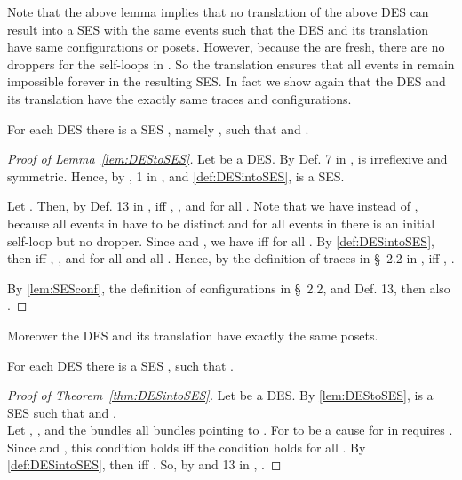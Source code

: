 \documentclass[runningheads,a4paper]{llncs}
\begin{document}
Note that the above lemma implies that no translation of the above DES can result into a SES with the same events such that the DES and its translation have same configurations or posets.
However, because the  are fresh, there are no droppers for the self-loops  in . So the translation ensures that all events in  remain impossible forever in the resulting SES. In fact we show again that the DES and its translation have the exactly same traces and configurations.

\begin{lemma}
	\label{lem:DEStoSES}
	For each DES  there is a SES , namely , such that  and .
\end{lemma}

\begin{proof}[Proof of Lemma~\ref{lem:DEStoSES}]
	Let  be a DES. By Def. 7 in \cite{dynamicCausality15},  is irreflexive and symmetric. Hence, by , 1 in \cite{dynamicCausality15}, and \ref{def:DESintoSES},  is a SES.	
	
	Let .	Then, by Def. 13 in \cite{dynamicCausality15},  iff , , and  for all . Note that we have  instead of , because all events in  have to be distinct and for all events in  there is an initial self-loop but no dropper.
	Since  and , we have   iff  for all .
	By \ref{def:DESintoSES}, then  iff , , and  for all  and all .
	Hence, by the definition of traces in \S~2.2 in \cite{dynamicCausality15},  iff , \ie .
	
	By \lem\ref{lem:SESconf}, the definition of
	configurations in \S~2.2, and Def. 13, then
	also .
\end{proof}

Moreover the DES and its translation have exactly the same posets.

\begin{theorem}
	\label{thm:DESintoSES}
	For each DES  there is a SES , such that .
\end{theorem}

\begin{proof}[Proof of Theorem~\ref{thm:DESintoSES}]
	Let  be a DES. By \lem\ref{lem:DEStoSES},  is a SES such that  and .\\
	Let , , and the bundles  all bundles pointing to .
	For  to be a cause for   in \cite{dynamicCausality15} requires .
	Since  and , this condition holds iff the condition  holds for all .
	By \ref{def:DESintoSES}, then  iff .
	So, by  and 13 in \cite{dynamicCausality15}, .
\end{proof}
\end{document}
